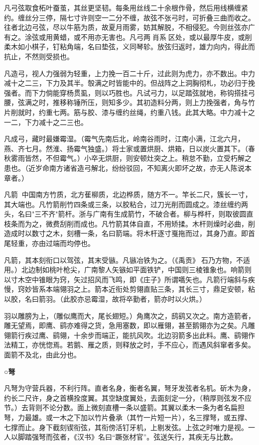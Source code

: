 \documentclass[]{article}
\begin{document}
凡弓弦取食柘叶蚕茧，其丝更坚韧。每条用丝线二十余根作骨，然后用线横缠紧约。缠丝分三停，隔七寸许则空一二分不缠，故弦不张弓时，可折叠三曲而收之。往者北边弓弦，尽以牛筋为质，故夏月雨雾，妨其解脱，不相侵犯。今则丝弦亦广有之。涂弦或用黄蜡，或不用亦无害也。凡弓两肖系区处，或以最厚牛皮，或削柔木如小棋子，钉粘角端，名曰垫弦，义同琴轸。放弦归返时，雄力向内，得此而抗止，不然则受损也。

凡造弓，视人力强弱为轻重，上力挽一百二十斤，过此则为虎力，亦不数出。中力减十之二三，下力及其半。彀满之时皆能中的。但战阵之上洞胸彻札，功必归于挽强者。而下力倘能穿杨贯虱，则以巧胜也。凡试弓力，以足踏弦就地，称钩搭挂弓腰，弦满之时，推移称锤所压，则知多少。其初造料分两，则上力挽强者，角与竹片削就时，约重七两。筋与胶、漆与缠约丝绳，约重八钱。此其大略。中力减十之一二，下力减十之二三也。

凡成弓，藏时最嫌霉湿。（霉气先南后北，岭南谷雨时，江南小满，江北六月，燕、齐七月。然淮、扬霉气独盛。）将士家或置烘厨、烘箱，日以炭火置其下。（春秋雾雨皆然，不但霉气。）小卒无烘厨，则安顿灶突之上。稍怠不勤，立受朽解之患也。（近岁命南方诸省造弓解北，纷纷驳回，不知离火即坏之故，亦无人陈说本章者。）

凡箭，中国南方竹质，北方萑柳质，北边桦质，随方不一。竿长二尺，簇长一寸，其大端也。凡竹箭削竹四条或三条，以胶粘合，过刀光削而圆成之。漆丝缠约两头，名曰"三不齐"箭杆。浙与广南有生成箭竹，不破合者。柳与桦杆，则取彼圆直枝条而为之，微费刮削而成也。凡竹箭其体自直，不用矫揉。木杆则燥时必曲，削造成时以数寸之木，刻槽一条，名曰箭端。将木杆逐寸戛拖而过，其身乃直。即首尾轻重，亦由过端而均停也。

凡箭，其本刻衔口以驾弦，其末受镞。凡镞冶铁为之。（《禹贡》石乃方物，不适用。）北边制如桃叶枪尖，广南黎人矢镞如平面铁铲，中国则三棱锥象也。响箭则以寸木空中锥眼为窍，矢过招风而飞鸣，即《庄子》所谓嚆矢也。凡箭行端斜与疾慢，窍妙皆系本端翎羽之上。箭本近衔处剪翎直贴三条，其长三寸，鼎足安顿，粘以胶，名曰箭羽。（此胶亦忌霉湿，故将卒勤者，箭亦时以火烘。）

羽以雕膀为上，（雕似鹰而大，尾长翅短。）角鹰次之，鸱鹞又次之。南方造箭者，雕无望焉，即鹰、鹞亦难得之货，急用塞数，即以雁翎，甚至鹅翎亦为之矣。凡雕翎箭行疾过鹰、鹞翎，十余步而端正，能抗风吹。北边羽箭多出此料。鹰、鹞翎作法精工，亦恍惚焉。若鹅、雁之质，则释放之时，手不应心，而遇风斜窜者多矣。面箭不及北，由此分也。

\textbf{○弩}

凡弩为守营兵器，不利行阵。直者名身，衡者名翼，弩牙发弦者名机。斫木为身，约长二尺许，身之首横拴度翼。其空缺度翼处，去面刻定一分，（稍厚则弦发不应节。）去背则不论分数。面上微刻直槽一条以盛箭。其翼以柔木一条为者名扁担弩，力最雄。或一木之下加以竹片叠承（其竹一片短一片），名三撑弩，或五撑、七撑而止。身下截刻锲衔弦，其衔傍活钉牙机，上剔发弦。上弦之时唯力是视。一人以脚踏强弩而弦者，《汉书》名曰``蹶张材官''。弦送矢行，其疾无与比数。
\end{document}
